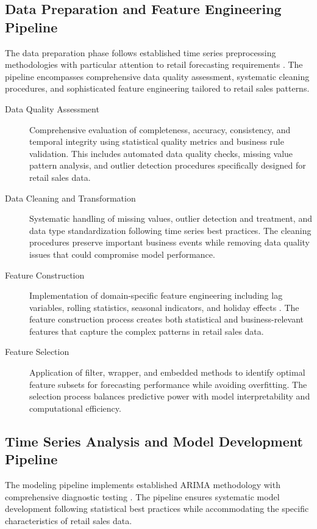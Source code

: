 		\subsection{Data Preparation and Feature Engineering Pipeline}
		
		The data preparation phase follows established time series preprocessing methodologies with particular attention to retail forecasting requirements \cite{Montgomery:2008}. The pipeline encompasses comprehensive data quality assessment, systematic cleaning procedures, and sophisticated feature engineering tailored to retail sales patterns.
		
		\begin{description}
			\item[Data Quality Assessment] Comprehensive evaluation of completeness, accuracy, consistency, and temporal integrity using statistical quality metrics and business rule validation. This includes automated data quality checks, missing value pattern analysis, and outlier detection procedures specifically designed for retail sales data.
			\item[Data Cleaning and Transformation] Systematic handling of missing values, outlier detection and treatment, and data type standardization following time series best practices. The cleaning procedures preserve important business events while removing data quality issues that could compromise model performance.
			\item[Feature Construction] Implementation of domain-specific feature engineering including lag variables, rolling statistics, seasonal indicators, and holiday effects \cite{Guyon:2003}. The feature construction process creates both statistical and business-relevant features that capture the complex patterns in retail sales data.
			\item[Feature Selection] Application of filter, wrapper, and embedded methods to identify optimal feature subsets for forecasting performance while avoiding overfitting. The selection process balances predictive power with model interpretability and computational efficiency.
		\end{description}
		
		\subsection{Time Series Analysis and Model Development Pipeline}
		
		The modeling pipeline implements established ARIMA methodology with comprehensive diagnostic testing \cite{Box:2016}. The pipeline ensures systematic model development following statistical best practices while accommodating the specific characteristics of retail sales data.
		
